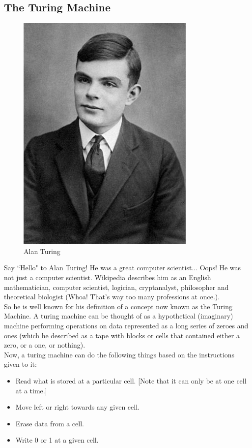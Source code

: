 \documentclass[letterpaper, 12pt]{book}
\begin{document}
\subsection{The Turing Machine}
\begin{figure}[h]
\centering
\includegraphics[scale=0.6]{img/turing}
\caption{Alan Turing}\label{turing}
\end{figure}
Say ``Hello" to Alan Turing! He was a great computer scientist... Oops! He was not just a computer scientist. Wikipedia describes him as an English mathematician, computer scientist, logician, cryptanalyst, philosopher and theoretical biologist (Whoa! That's way too many professions at once.).\\
So he is well known for his definition of a concept now known as the Turing Machine. A turing machine can be thought of as a hypothetical (imaginary) machine performing operations on data represented as a long series of zeroes and ones (which he described as a tape with blocks or cells that contained either a zero, or a one, or nothing).\\
Now, a turing machine can do the following things based on the instructions given to it:
\begin{itemize}
	\item Read what is stored at a particular cell. [Note that it can only be at one cell at a time.]
	\item Move left or right towards any given cell.
	\item Erase data from a cell.
	\item Write 0 or 1 at a given cell.
\end{itemize}
\end{document}
